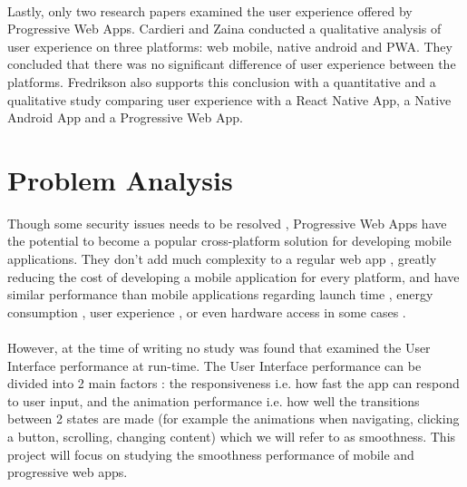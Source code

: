 \documentclass{kththesis}
\begin{document}
\paragraph{}
Lastly, only two research papers examined the user experience offered by Progressive Web Apps. Cardieri and Zaina \cite{PWA_UX_comparison_study} conducted a qualitative analysis of user experience on three platforms: web mobile, native android and PWA. They concluded that there was no significant difference of user experience between the platforms. Fredrikson \cite{emulating_native_w_crossplatform} also supports this conclusion with a quantitative and a qualitative study comparing user experience with a React Native App, a Native Android App and a Progressive Web App. 
\fi


\section{Problem Analysis}


Though some security issues needs to be resolved \cite{Pride_Prejudice}, Progressive Web Apps have the potential to become a popular cross-platform solution for developing mobile applications. They don't add much complexity to a regular web app \cite{JohannsenFabian2018PWAa}, greatly reducing the cost of developing a mobile application for every platform, and have similar performance than mobile applications regarding launch time \cite{PWApossibleUnifer}\cite{Biorn-Hansen2} \cite{PWAapplicability}, energy consumption \cite{PWAapplicability}, user experience \cite{emulating_native_w_crossplatform}\cite{PWA_UX_comparison_study}, or even hardware access in some cases \cite{PWAbc_responsetime}. 
\paragraph{}

However, at the time of writing no study was found that examined the User Interface performance at run-time. The User Interface performance can be divided into 2 main factors : the responsiveness i.e. how fast the app can respond to user input, and the animation performance i.e. how well the transitions between 2 states are made (for example the animations when navigating, clicking a button, scrolling, changing content) which we will refer to as smoothness. This project will focus on studying the smoothness performance of mobile and progressive web apps.
\end{document}
